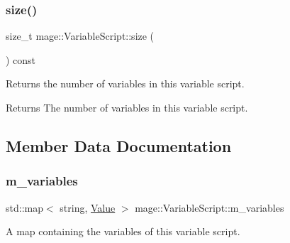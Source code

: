 \subsubsection{\texorpdfstring{size()}{size()}}
{\footnotesize\ttfamily size\+\_\+t mage\+::\+Variable\+Script\+::size (\begin{DoxyParamCaption}{ }\end{DoxyParamCaption}) const\hspace{0.3cm}{\ttfamily [noexcept]}}

Returns the number of variables in this variable script.

\begin{DoxyReturn}{Returns}
The number of variables in this variable script. 
\end{DoxyReturn}


\subsection{Member Data Documentation}
\mbox{\label{classmage_1_1_variable_script_aed925cedf17c486fad876764e53d9e04}} 
\subsubsection{\texorpdfstring{m\+\_\+variables}{m\_variables}}
{\footnotesize\ttfamily std\+::map$<$ string, \mbox{\hyperlink{namespacemage_aa1fe0628487e0706e44efdc62dbdb3a2}{Value}} $>$ mage\+::\+Variable\+Script\+::m\+\_\+variables\hspace{0.3cm}{\ttfamily [private]}}

A map containing the variables of this variable script. 